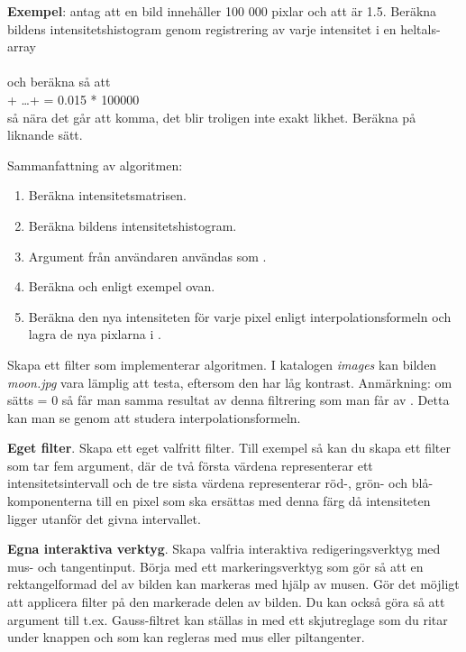 \noindent \textbf{Exempel}: antag att en bild innehåller 100 000 pixlar och att  är 1.5. Beräkna bildens intensitetshistogram genom registrering av varje intensitet i en heltals-array \\  \\och beräkna  så att \\ + \ldots +  = 0.015 * 100000 \\så nära det går att komma, det blir troligen inte exakt likhet. Beräkna  på liknande sätt.

\vspace{1em}


\noindent Sammanfattning av algoritmen:
\begin{enumerate}
	\item Beräkna intensitetsmatrisen.
	\item Beräkna bildens intensitetshistogram.
	\item Argument från användaren användas som .
	\item Beräkna  och  enligt exempel ovan.
	\item Beräkna den nya intensiteten för varje pixel enligt interpolationsformeln och lagra de nya pixlarna i .
\end{enumerate}
Skapa ett filter  som implementerar algoritmen. I katalogen \emph{images} kan bilden \emph{moon.jpg} vara lämplig att testa, eftersom den har låg kontrast. Anmärkning: om  sätts = 0 så får man samma resultat av denna filtrering som man får av . Detta kan man se genom att studera interpolationsformeln.

\Task \textbf{Eget filter}. Skapa ett eget valfritt filter. Till exempel så kan du skapa ett filter som tar fem argument, där de två första värdena representerar ett intensitetsintervall och de tre sista värdena representerar röd-, grön- och blå-komponenterna till en pixel
som ska ersättas med denna färg då intensiteten ligger utanför det givna intervallet. 

\Task \textbf{Egna interaktiva verktyg}. Skapa valfria interaktiva redigeringsverktyg med mus- och tangentinput. Börja med ett markeringsverktyg som gör så att en rektangelformad del av bilden kan markeras med hjälp av musen. Gör det möjligt att applicera filter på den markerade delen av bilden. Du kan också göra så att argument till t.ex. Gauss-filtret kan ställas in med ett skjutreglage som du ritar under knappen och som kan regleras med mus eller piltangenter.
